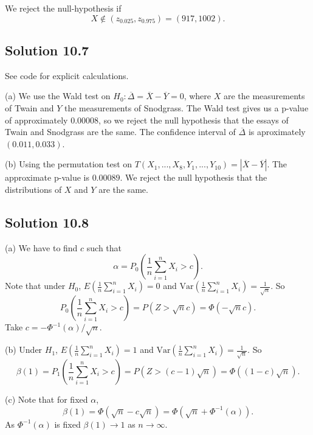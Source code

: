We reject the null-hypothesis if
$$
    X \notin (z_{0.025}, z_{0.975}) = (917, 1002).
$$


\subsection*{Solution 10.7}

See code for explicit calculations.

(a) We use the Wald test on $H_0: \overline{\Delta} = \overline{X} - \overline{Y} = 0$, where $X$ are the measurements of Twain and $Y$ the measurements of Snodgrass.
The Wald test gives us a p-value of approximately $0.00008$, so we reject the null hypothesis that the essays of Twain and Snodgrass are the same.
The confidence interval of $\overline{\Delta}$ is aproximately $(0.011, 0.033)$.

(b) Using the permutation test on $T(X_1, ..., X_8, Y_1, ..., Y_{10}) = |\overline{X} - \overline{Y}|$.
The approximate p-value is $0.00089$.
We reject the null hypothesis that the distributions of $X$ and $Y$ are the same.


\subsection*{Solution 10.8}

(a) We have to find $c$ such that
$$
\alpha = P_0\left(\frac{1}{n}\sum_{i = 1}^n X_i > c\right).
$$
Note that under $H_0$, $E(\frac{1}{n}\sum_{i = 1}^n X_i) = 0$ and $\mathrm{Var}(\frac{1}{n}\sum_{i = 1}^n X_i) = \frac{1}{\sqrt{n}}$.
So
$$
P_0\left(\frac{1}{n} \sum_{i = 1}^n X_i > c\right) = P(Z > \sqrt{n}c) = \Phi(-\sqrt{n}c).
$$
Take $c = -\Phi^{-1}(\alpha)/\sqrt{n}$.

(b) Under $H_1$, $E(\frac{1}{n} \sum_{i = 1}^n X_i) = 1$ and $\mathrm{Var}(\frac{1}{n} \sum_{i = 1}^n X_i) = \frac{1}{\sqrt{n}}$.
So
$$
\beta(1) = P_1\left(\frac{1}{n} \sum_{i = 1}^n X_i > c\right) = P(Z > (c - 1)\sqrt{n}) = \Phi((1 - c)\sqrt{n}).
$$

(c) Note that for fixed $\alpha$,
$$
\beta(1) = \Phi(\sqrt{n} - c\sqrt{n}) = \Phi(\sqrt{n} + \Phi^{-1}(\alpha)).
$$
As $\Phi^{-1}(\alpha)$ is fixed $\beta(1) \to 1$ as $n \to \infty$.


